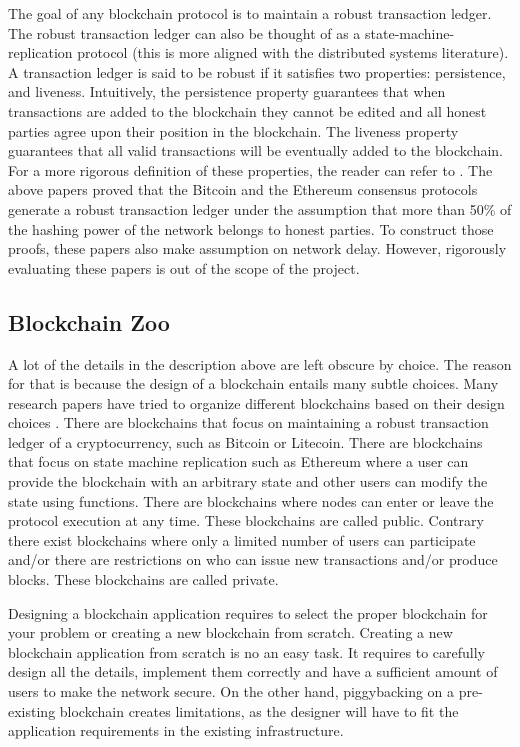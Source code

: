 {{{The goal of any blockchain protocol is to maintain a robust transaction ledger. The robust transaction ledger can also be thought of as a state-machine-replication protocol (this is more aligned with the distributed systems literature). A transaction ledger is said to be robust if it satisfies two properties: persistence, and liveness. Intuitively, the persistence property guarantees that when transactions are added to the blockchain they cannot be edited and all honest parties agree upon their position in the blockchain. The liveness property guarantees that all valid transactions will be eventually added to the blockchain. For a more rigorous definition of these properties, the reader can refer to \cite{Garay2017The,Pass2017AnalysisNetworks,Kiayias2016OnBlockchain}. The above papers proved that the Bitcoin and the Ethereum consensus protocols generate a robust transaction ledger under the assumption that more than 50\% of the hashing power of the network belongs to honest parties. To construct those proofs, these papers also make assumption on network delay. However, rigorously evaluating these papers is out of the scope of the project. 
}

\subsection{Blockchain Zoo}\label{sec:blockchainZoo}{

A lot of the details in the description above are left obscure by choice. The reason for that is because the design of a blockchain entails many subtle choices. Many research papers have tried to organize different blockchains based on their design choices \cite{Vukolic2016TheReplication}. There are blockchains that focus on maintaining a robust transaction ledger of a cryptocurrency, such as Bitcoin or Litecoin. There are blockchains that focus on state machine replication such as Ethereum where a user can provide the blockchain with an arbitrary state and other users can modify the state using functions. There are blockchains where nodes can enter or leave the protocol execution at any time. These blockchains are called public. Contrary there exist blockchains where only a limited number of users can participate and/or there are restrictions on who can issue new transactions and/or produce blocks. These blockchains are called private.

Designing a blockchain application requires to select the proper blockchain for your problem or creating a new blockchain from scratch. Creating a new blockchain application from scratch is no an easy task. It requires to carefully design all the details, implement them correctly and have a sufficient amount of users to make the network secure. On the other hand, piggybacking on a pre-existing blockchain creates limitations, as the designer will have to fit the application requirements in the existing infrastructure.
}
}
}
